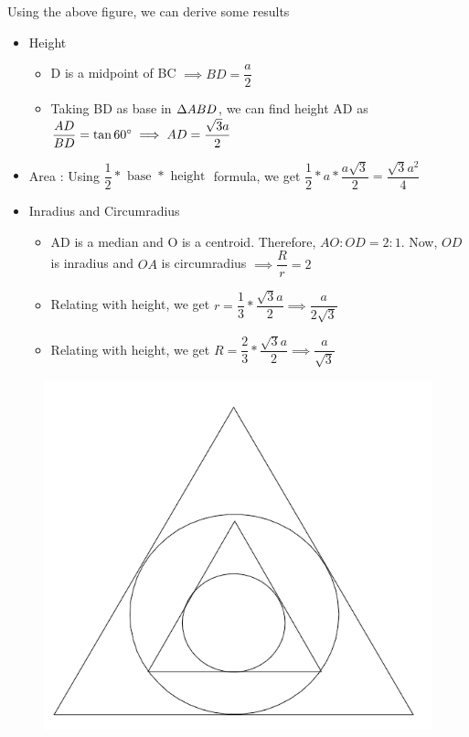 Using the above figure, we can derive some results
\begin{itemize}
    \item Height
    \begin{itemize}
        \item D is a midpoint of BC $\implies BD = \dfrac{a}{2}$
        \item Taking BD as base in $\Delta {ABD}$, we can find height AD as $\dfrac{AD}{BD} = \tan{ {60}^{\circ} } \implies AD = \dfrac{\sqrt{3} a}{2}$
    \end{itemize}

    \item Area : Using $\dfrac{1}{2} * \text{ base } * \text{ height }$ formula, we get $\dfrac{1}{2} * a * \dfrac{a \sqrt{3}}{2} = \dfrac{\sqrt{3} a^2}{4}$

    \item Inradius and Circumradius
    \begin{itemize}
        \item AD is a median and O is a centroid. Therefore, $AO : OD = 2 : 1$. Now, $OD$ is inradius and $OA$ is circumradius $\implies \dfrac{R}{r} = 2$
        \item Relating with height, we get $r = \dfrac{1}{3} * \dfrac{\sqrt{3} a}{2} \implies \dfrac{a}{2 \sqrt{3}}$
        \item Relating with height, we get $R = \dfrac{2}{3} * \dfrac{\sqrt{3} a}{2} \implies \dfrac{a}{\sqrt{3}}$
    \end{itemize}
\end{itemize}
\newpage


\begin{figure}[h!]
    \centering
    \includegraphics[width=0.5\linewidth]{Quant//Geometry//Images//Triangles/triangle_13_q1.png}
\end{figure}

